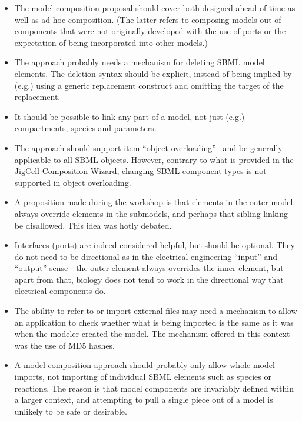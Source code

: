 \begin{enumerate}
\begin{itemize}
    \item The model composition proposal should cover both
      designed-ahead-of-time as well as ad-hoc composition. (The latter
      refers to composing models out of components that were not
      originally developed with the use of ports or the expectation of
      being incorporated into other models.)

    \item The approach probably needs a mechanism for deleting SBML
      model elements.  The deletion syntax should be explicit, instead
      of being implied by (e.g.) using a generic replacement construct
      and omitting the target of the replacement.

    \item It should be possible to link any part of a model, not just
      (e.g.) compartments, species and parameters.

    \item The approach should support item ``object
      overloading''~\cite{x} and be generally applicable to all SBML
      objects.  However, contrary to what is provided in the JigCell
      Composition Wizard, changing SBML component types is not supported
      in object overloading.

    \item A proposition made during the workshop is that elements in the
      outer model always override elements in the submodels, and perhaps
      that sibling linking be disallowed.  This idea was hotly debated.

    \item Interfaces (ports) are indeed considered helpful, but should
      be optional.  They do not need to be directional as in the
      electrical engineering ``input'' and ``output'' sense---the outer
      element always overrides the inner element, but apart from that,
      biology does not tend to work in the directional way that
      electrical components do.

    \item The ability to refer to or import external files may need a
      mechanism to allow an application to check whether what is being
      imported is the same as it was when the modeler created the
      model.  The mechanism offered in this context was the use of MD5
      hashes.

    \item A model composition approach should probably only allow
      whole-model imports, not importing of individual SBML elements
      such as species or reactions.  The reason is that model components
      are invariably defined within a larger context, and attempting to
      pull a single piece out of a model is unlikely to be safe or
      desirable.


\end{itemize}
\end{enumerate}
